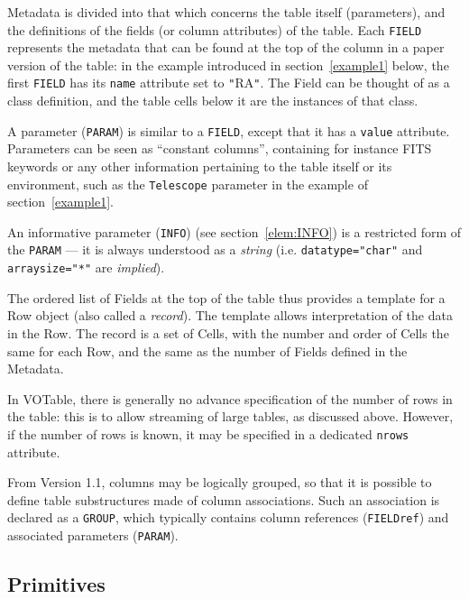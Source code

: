 \documentclass[11pt,a4paper]{ivoa}
\def\Aref#1{section~\ref{#1}}
\def\Arefs#1{section~\ref{#1}}
\let\fg=\color
\def\attr#1{{\tt{\fg{DarkRed}#1}}}
\def\elem#1{{\tt{\fg{DarkRed}#1}}}
\def\attrval#1#2{{\tt{\fg{DarkRed}#1}="{\fg{DarkPurple}#2}"}}
\def\literalvalue#1{{\tt"}{{\fg{DarkPurple}#1}}{\tt"}}
\begin{document}
\medskip
\par\noindent
Metadata is divided into that which concerns the table itself
(parameters), and the definitions of the fields (or column
attributes) of the table.
Each \elem{FIELD} represents the metadata
that can be found at the
top of the column in a paper version of the table:
in the example introduced in \Aref{example1}
below, the first \elem{FIELD} has its \attr{name} attribute
set to \literalvalue{RA}. The Field can be thought of as a class definition,
and the table cells below it are the instances of that class.

A parameter ({\elem{PARAM}})
is similar to a {\elem{FIELD}},
except that it has a \attr{value} attribute.
Parameters can be seen as ``constant columns'', containing for instance
FITS keywords or any other
information pertaining to the table itself or its environment, such as the
{\tt Telescope} parameter in the example of \Arefs{example1}.

An informative parameter ({\elem{INFO}}) (see \Arefs{elem:INFO})
is a restricted form of the {\elem{PARAM}} ---  it is always understood
as a {\em string} (i.e. \attrval{datatype}{char}
and \attrval{arraysize}{*} are {\em implied}).

\mbox{}{\color{black}}%
%
The ordered list of Fields at the top of the table thus provides a
template for a Row object (also called a {\it record}). The
template allows interpretation of the data in the Row.
The
record is a set of Cells, with the number and order of Cells the same for each
Row, and the same as the number of Fields defined in the Metadata.

In VOTable,
there is generally no advance specification of the number of rows in the table:
this is to allow streaming of large tables, as discussed above.
However, if the number of rows is known, it may be specified in a
dedicated \attr{nrows} attribute.

From Version 1.1, columns may be logically grouped, so that it is
possible to define table substructures made of column associations.
Such an association is declared as a \elem{GROUP}, which typically
contains column references (\elem{FIELDref})
and associated parameters (\elem{PARAM}).

\subsection{Primitives}
\end{document}
